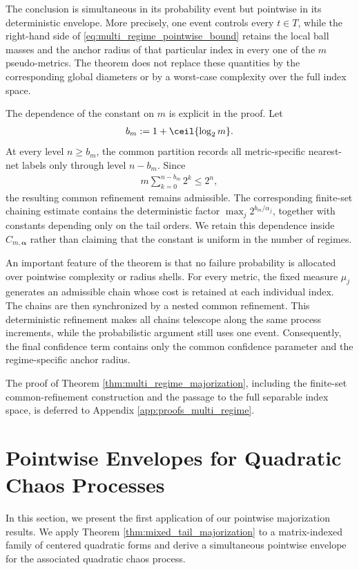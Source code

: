\documentclass[11pt]{article}
\begin{document}
The conclusion is simultaneous in its probability event but pointwise in
its deterministic envelope. More precisely, one event controls every
$t\in T$, while the right-hand side of
\eqref{eq:multi_regime_pointwise_bound} retains the local ball masses and
the anchor radius of that particular index in every one of the $m$
pseudo-metrics. The theorem does not replace these quantities by the
corresponding global diameters or by a worst-case complexity over the full
index space.

The dependence of the constant on $m$ is explicit in the proof. Let
\begin{align*}
b_m
:=
1+\ceil{\log_2m}.
\end{align*}
At every level $n\ge b_m$, the common partition records all
metric-specific nearest-net labels only through level $n-b_m$. Since
\begin{align*}
m\sum_{k=0}^{n-b_m}2^k
\le
2^n,
\end{align*}
the resulting common refinement remains admissible. The corresponding
finite-set chaining estimate contains the deterministic factor
$\max_j2^{b_m/\alpha_j}$, together with constants depending only on the
tail orders. We retain this dependence inside
$C_{m,\boldsymbol\alpha}$ rather than claiming that the constant is
uniform in the number of regimes.

An important feature of the theorem is that no failure probability is
allocated over pointwise complexity or radius shells. For every metric,
the fixed measure $\mu_j$ generates an admissible chain whose cost is
retained at each individual index. The chains are then synchronized by a
nested common refinement. This deterministic refinement makes all chains
telescope along the same process increments, while the probabilistic
argument still uses one event. Consequently, the final
confidence term contains only the common confidence parameter and the
regime-specific anchor radius.



The proof of Theorem \ref{thm:multi_regime_majorization}, including the
finite-set common-refinement construction and the passage to the full
separable index space, is deferred to
Appendix \ref{app:proofs_multi_regime}.







\iffalse
\section{Pointwise Envelopes for Quadratic Chaos Processes}\label{sec:pointwise-chaos}
In this section, we present the first application of our pointwise
majorization results. We apply Theorem
\ref{thm:mixed_tail_majorization} to a matrix-indexed family of
centered quadratic forms and derive a simultaneous pointwise envelope
for the associated quadratic chaos process.
\end{document}
